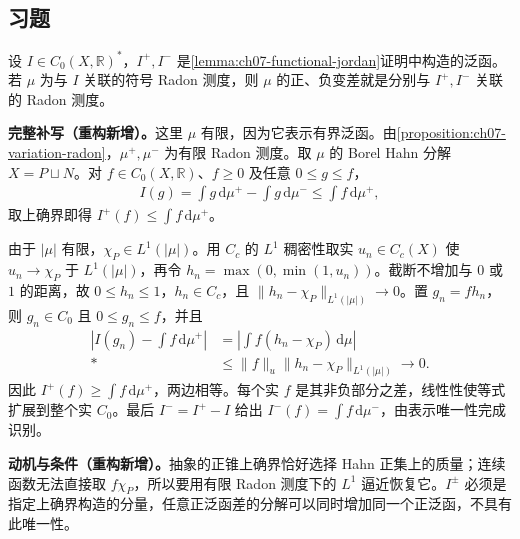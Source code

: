 \documentclass[../../main.tex]{subfiles}
\begin{document}
\subsection*{习题}
\begin{exercise}\label{exercise:ch07-functional-measure-jordan}
设 $I\in C_0(X,\mathbb R)^*$，$I^+,I^-$ 是\cref{lemma:ch07-functional-jordan}证明中构造的泛函。若 $\mu$ 为与 $I$ 关联的符号 Radon 测度，则 $\mu$ 的正、负变差就是分别与 $I^+,I^-$ 关联的 Radon 测度。
\end{exercise}
\begin{solution}
\textbf{完整补写（重构新增）。}这里 $\mu$ 有限，因为它表示有界泛函。由\cref{proposition:ch07-variation-radon}，$\mu^+,\mu^-$ 为有限 Radon 测度。取 $\mu$ 的 Borel Hahn 分解 $X=P\sqcup N$。对 $f\in C_0(X,\mathbb R)$、$f\geqslant0$ 及任意 $0\leqslant g\leqslant f$，
\begin{align*}
I(g)=\int g\,\mathrm d\mu^+-\int g\,\mathrm d\mu^-
\leqslant\int f\,\mathrm d\mu^+,
\end{align*}
取上确界即得 $I^+(f)\leqslant\int f\,\mathrm d\mu^+$。

由于 $|\mu|$ 有限，$\chi_P\in L^1(|\mu|)$。用 $C_c$ 的 $L^1$ 稠密性取实 $u_n\in C_c(X)$ 使 $u_n\to\chi_P$ 于 $L^1(|\mu|)$，再令 $h_n=\max(0,\min(1,u_n))$。截断不增加与 $0$ 或 $1$ 的距离，故 $0\leqslant h_n\leqslant1$，$h_n\in C_c$，且 $\|h_n-\chi_P\|_{L^1(|\mu|)}\to0$。置 $g_n=fh_n$，则 $g_n\in C_0$ 且 $0\leqslant g_n\leqslant f$，并且
\begin{align*}
\left|I(g_n)-\int f\,\mathrm d\mu^+\right|
&=\left|\int f(h_n-\chi_P)\,\mathrm d\mu\right|\\*
&\leqslant\|f\|_u\|h_n-\chi_P\|_{L^1(|\mu|)}\longrightarrow0.
\end{align*}
因此 $I^+(f)\geqslant\int f\,\mathrm d\mu^+$，两边相等。每个实 $f$ 是其非负部分之差，线性性使等式扩展到整个实 $C_0$。最后 $I^-=I^+-I$ 给出 $I^-(f)=\int f\,\mathrm d\mu^-$，由表示唯一性完成识别。
\end{solution}
\begin{remark}
\textbf{动机与条件（重构新增）。}抽象的正锥上确界恰好选择 Hahn 正集上的质量；连续函数无法直接取 $f\chi_P$，所以要用有限 Radon 测度下的 $L^1$ 逼近恢复它。$I^\pm$ 必须是指定上确界构造的分量，任意正泛函差的分解可以同时增加同一个正泛函，不具有此唯一性。
\end{remark}
\end{document}
